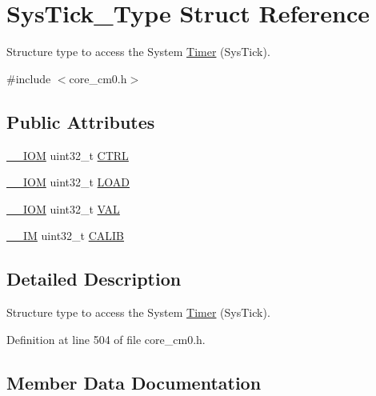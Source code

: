 \hypertarget{struct_sys_tick___type}{}\section{Sys\+Tick\+\_\+\+Type Struct Reference}
\label{struct_sys_tick___type}


Structure type to access the System \hyperlink{class_timer}{Timer} (Sys\+Tick).  




{\ttfamily \#include $<$core\+\_\+cm0.\+h$>$}

\subsection*{Public Attributes}
\begin{DoxyCompactItemize}
\item 
\hyperlink{core__sc300_8h_ab6caba5853a60a17e8e04499b52bf691}{\+\_\+\+\_\+\+I\+OM} uint32\+\_\+t \hyperlink{struct_sys_tick___type_a875e7afa5c4fd43997fb544a4ac6e37e}{C\+T\+RL}
\item 
\hyperlink{core__sc300_8h_ab6caba5853a60a17e8e04499b52bf691}{\+\_\+\+\_\+\+I\+OM} uint32\+\_\+t \hyperlink{struct_sys_tick___type_a4780a489256bb9f54d0ba8ed4de191cd}{L\+O\+AD}
\item 
\hyperlink{core__sc300_8h_ab6caba5853a60a17e8e04499b52bf691}{\+\_\+\+\_\+\+I\+OM} uint32\+\_\+t \hyperlink{struct_sys_tick___type_a9b5420d17e8e43104ddd4ae5a610af93}{V\+AL}
\item 
\hyperlink{core__sc300_8h_a4cc1649793116d7c2d8afce7a4ffce43}{\+\_\+\+\_\+\+IM} uint32\+\_\+t \hyperlink{struct_sys_tick___type_afcadb0c6d35b21cdc0018658a13942de}{C\+A\+L\+IB}
\end{DoxyCompactItemize}


\subsection{Detailed Description}
Structure type to access the System \hyperlink{class_timer}{Timer} (Sys\+Tick). 

Definition at line 504 of file core\+\_\+cm0.\+h.



\subsection{Member Data Documentation}
\mbox{\label{struct_sys_tick___type_afcadb0c6d35b21cdc0018658a13942de}} 
